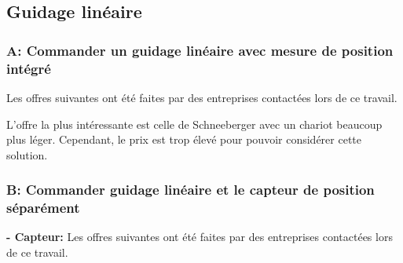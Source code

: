 \subsection{Guidage linéaire}
\subsubsection{A: Commander un guidage linéaire avec mesure de position intégré}
Les offres suivantes ont été faites par des entreprises contactées lors de ce travail.

\begin{table}[H]
  \centering
  \caption{Offres pour le guidage linéaire avec mesure de position}
  \label{tab:OffreGuidPos}
\end{table}

L'offre la plus intéressante est celle de Schneeberger \cite{Schneeberger} avec un chariot beaucoup plus léger. Cependant, le prix est trop élevé pour pouvoir considérer cette solution.

\subsubsection{B: Commander guidage linéaire et le capteur de position séparément}
\textbf{ - Capteur:}
\newline
Les offres suivantes ont été faites par des entreprises contactées lors de ce travail.

\begin{table}[H]
  \centering
  \caption{Offres pour le capteur pour la mesure de position}
  \label{tab:OffrePos}
\end{table}


